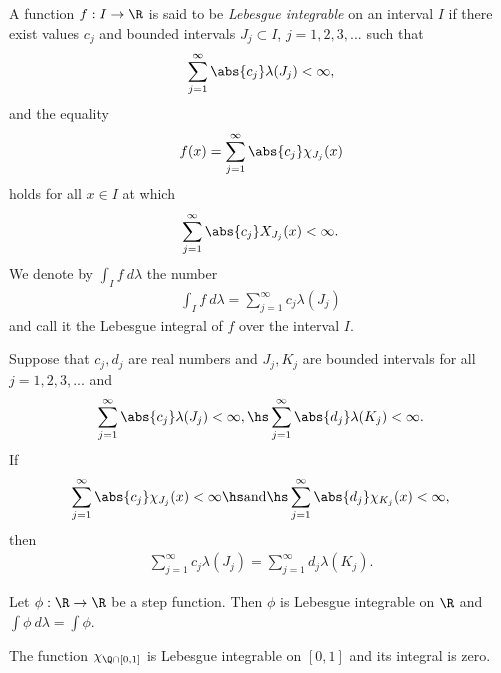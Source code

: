 \documentclass{article}
\begin{document}
\begin{definition}
	\label{lebesgue}
	A function $f:I\to\R$ is said to be \emph{Lebesgue integrable} on an interval
	$I$ if there exist values $c_j$ and bounded intervals $J_j\subset I$, $j=1,2,3,...$
	such that
	\begin{align*}
		\sum_{j=1}^\infty \abs{c_j}\lambda (J_j) < \infty,
	\end{align*}
	and the equality
	\begin{align*}
		f(x) = \sum_{j=1}^\infty \abs{c_j}\chi_{J_j}(x)
	\end{align*}
	holds for all $x\in I$ at which
	\begin{align*}
		\sum_{j=1}^\infty \abs{c_j} X_{J_j}(x) < \infty.
	\end{align*}
	We denote by $\int_I f\:d\lambda$ the number
	\begin{align*}
		\int_I f\:d\lambda = \sum_{j=1}^\infty c_j\lambda(J_j)
	\end{align*}
	and call it the Lebesgue integral of $f$ over the interval $I$.
\end{definition}

\begin{theorem}[Notes 4.1]
	Suppose that $c_j,d_j$ are real numbers and $J_j,K_j$ are bounded intervals
	for all $j=1,2,3,...$ and
	\begin{align*}
		\sum_{j=1}^\infty \abs{c_j}\lambda(J_j)<\infty, \hs
		\sum_{j=1}^\infty \abs{d_j}\lambda(K_j)<\infty.
	\end{align*}
	If
	\begin{align*}
		\sum_{j=1}^\infty \abs{c_j}\chi_{J_j}(x) < \infty\hs\text{and}\hs
		\sum_{j=1}^\infty \abs{d_j}\chi_{K_j}(x) <\infty,
	\end{align*}
	then
	\begin{align*}
		\sum_{j=1}^\infty c_j\lambda(J_j)= \sum_{j=1}^\infty d_j\lambda(K_j).
	\end{align*}
\end{theorem}

\begin{corollary}
	Let $\phi:\R\to\R$ be a step function. Then $\phi$ is Lebesgue integrable on $\R$
	and $\int\phi\:d\lambda = \int\phi$.
\end{corollary}

\begin{corollary}
	The function $\chi_{\Q\cap[0,1]}$ is Lebesgue integrable on $[0,1]$ and its integral is zero.
\end{corollary}
\end{document}
